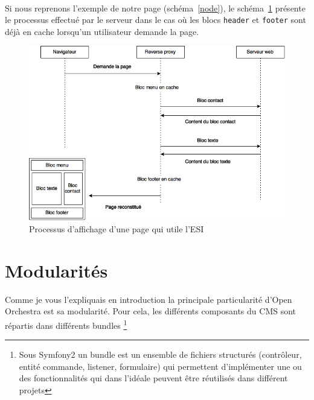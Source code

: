    \paragraph{}
   Si nous reprenons l'exemple de notre page (schéma~\ref{node}), le schéma~\ref{esi} présente le processus effectué par le serveur dans le cas où les blocs \verb?header? et \verb?footer? sont déjà en cache lorsqu'un utilisateur demande la page.
   		\begin{figure}[H]
        \begin{center}
          \includegraphics[scale=1]{images/esi}
        \end{center}
        \caption{Processus d'affichage d'une page qui utile l'ESI}
        \label{esi}
      \end{figure}
   
   \section{Modularités}
   Comme je vous l'expliquais en introduction la principale particularité d'Open Orchestra est sa modularité. Pour cela, les différents composants du CMS sont répartis dans différents bundles \footnote{Sous Symfony2 un bundle est un ensemble de fichiers structurés (contrôleur, entité commande, listener, formulaire) qui permettent d'implémenter une ou des fonctionnalités qui dans l'idéale peuvent être réutilisés dans différent projets}
